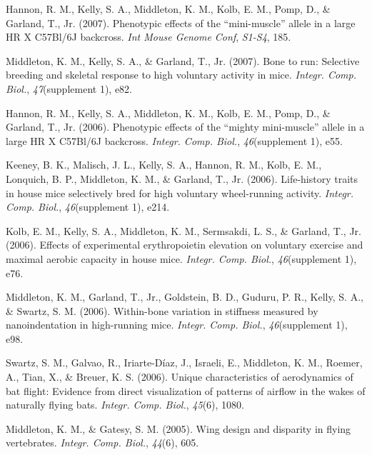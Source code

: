 \documentclass[11pt, a4paper]{awesome-cv}
\begin{document}
\leavevmode\hypertarget{ref-hannon_phenotypic_2007}{}%
Hannon, R. M., Kelly, S. A., Middleton, K. M., Kolb, E. M., Pomp, D., \&
Garland, T., Jr. (2007). Phenotypic effects of the ``mini-muscle''
allele in a large HR X C57Bl/6J backcross. \emph{Int Mouse Genome Conf},
\emph{S1-S4}, 185.

\leavevmode\hypertarget{ref-middleton_bone_2007}{}%
Middleton, K. M., Kelly, S. A., \& Garland, T., Jr. (2007). Bone to run:
Selective breeding and skeletal response to high voluntary activity in
mice. \emph{Integr. Comp. Biol.}, \emph{47}(supplement 1), e82.

\leavevmode\hypertarget{ref-hannon_phenotypic_2006}{}%
Hannon, R. M., Kelly, S. A., Middleton, K. M., Kolb, E. M., Pomp, D., \&
Garland, T., Jr. (2006). Phenotypic effects of the ``mighty
mini-muscle'' allele in a large HR X C57Bl/6J backcross. \emph{Integr.
Comp. Biol.}, \emph{46}(supplement 1), e55.

\leavevmode\hypertarget{ref-keeney_life_2006}{}%
Keeney, B. K., Malisch, J. L., Kelly, S. A., Hannon, R. M., Kolb, E. M.,
Lonquich, B. P., Middleton, K. M., \& Garland, T., Jr. (2006).
Life-history traits in house mice selectively bred for high voluntary
wheel-running activity. \emph{Integr. Comp. Biol.}, \emph{46}(supplement
1), e214.

\leavevmode\hypertarget{ref-kolb_effects_2006}{}%
Kolb, E. M., Kelly, S. A., Middleton, K. M., Sermsakdi, L. S., \&
Garland, T., Jr. (2006). Effects of experimental erythropoietin
elevation on voluntary exercise and maximal aerobic capacity in house
mice. \emph{Integr. Comp. Biol.}, \emph{46}(supplement 1), e76.

\leavevmode\hypertarget{ref-middleton_bone_2006}{}%
Middleton, K. M., Garland, T., Jr., Goldstein, B. D., Guduru, P. R.,
Kelly, S. A., \& Swartz, S. M. (2006). Within-bone variation in
stiffness measured by nanoindentation in high-running mice.
\emph{Integr. Comp. Biol.}, \emph{46}(supplement 1), e98.

\leavevmode\hypertarget{ref-swartz_unique_2006}{}%
Swartz, S. M., Galvao, R., Iriarte-Díaz, J., Israeli, E., Middleton, K.
M., Roemer, A., Tian, X., \& Breuer, K. S. (2006). Unique
characteristics of aerodynamics of bat flight: Evidence from direct
visualization of patterns of airflow in the wakes of naturally flying
bats. \emph{Integr. Comp. Biol.}, \emph{45}(6), 1080.

\leavevmode\hypertarget{ref-middleton_wing_2005}{}%
Middleton, K. M., \& Gatesy, S. M. (2005). Wing design and disparity in
flying vertebrates. \emph{Integr. Comp. Biol.}, \emph{44}(6), 605.
\end{document}
